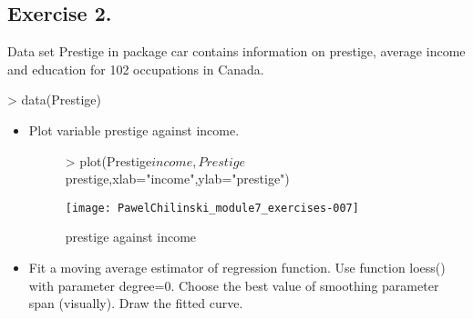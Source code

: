 \documentclass[a4paper]{article}
\begin{document}
\subsection{Exercise 2.} Data set Prestige in package car contains information
on prestige, average income and education for 102 occupations in Canada.
\begin{Schunk}
\begin{Sinput}
> data(Prestige)	
\end{Sinput}
\end{Schunk}
\begin{itemize}
  
\item Plot variable prestige against income.

\begin{figure}[H]
\begin{center}
\begin{Schunk}
\begin{Sinput}
> plot(Prestige$income,Prestige$prestige,xlab="income",ylab="prestige")
\end{Sinput}
\end{Schunk}
\texttt{[image: PawelChilinski\_module7\_exercises-007]}
\caption{prestige against income}
\end{center}
\end{figure}

\item Fit a moving average estimator of regression function. Use function
loess() with parameter degree=0. Choose the best value of smoothing parameter span (visually). Draw the fitted curve.


\end{itemize}
\end{document}

